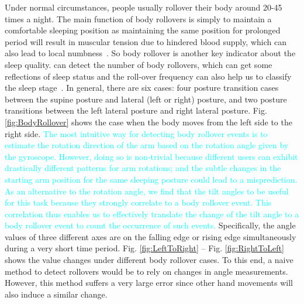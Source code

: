 Under normal circumstances, people usually rollover their body around 20-45 times a night. The main function of body rollovers is simply to
maintain a comfortable sleeping position as maintaining the same position for prolonged period will result in muscular tension due to
hindered blood supply, which can also lead to local numbness~\cite{rollover2014}. So body rollover is another key indicator about the sleep
quality. {\systemname} can detect the number of body rollovers, which can get some reflections of sleep status and the roll-over frequency
can also help us to classify the sleep stage~\cite{rollover2007}. In general, there are six cases: four posture transition cases between
the supine posture and lateral (left or right) posture, and two posture transitions between the left lateral posture and right lateral
posture. Fig. \ref{fig:BodyRollover} shows the case when the body moves from the left side to the right side.
%
\textcolor{cyan}{The most intuitive way for detecting body rollover events is to estimate the rotation direction of the arm based on the
rotation angle given by the gyroscope. However, doing so is non-trivial because different users can exhibit drastically different patterns
for arm rotations; and the subtle changes in the starting arm position for the same sleeping posture could lead to a misprediction. As an
alternative to the rotation angle, we find that the tilt angles to be useful for this task because they strongly correlate to a body
rollover event. This correlation thus enables us to effectively translate the change of the tilt angle to a body rollover event to count
the occurrence of such events.} Specifically, the angle values of three different axes are on the falling edge or rising edge
simultaneously during a very short time period. Fig. \ref{fig:LeftToRight} -- Fig. \ref{fig:RightToLeft} shows the value changes under
different body rollover cases. To this end, a naive method to detect rollovers would be to rely on changes in angle measurements. However,
this method suffers a very large error since other hand movements will also induce a similar change.


